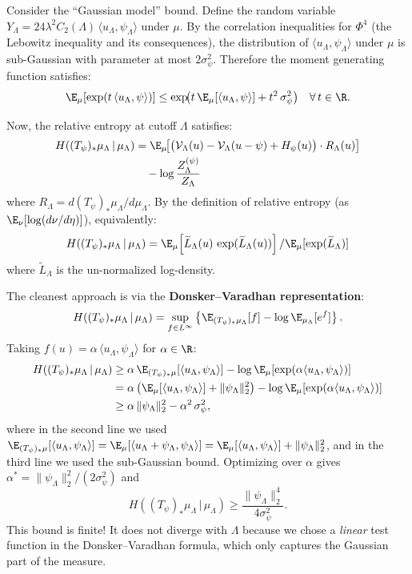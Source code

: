 Consider the ``Gaussian model'' bound. Define the random variable
$Y_\Lambda = 24\lambda^2 C_2(\Lambda)\,\langle u_\Lambda, \psi_\Lambda\rangle$
under $\mu$. By the correlation inequalities for $\Phi^4$ (the
Lebowitz inequality \cite{Leb72} and its consequences), the distribution
of $\langle u_\Lambda, \psi_\Lambda\rangle$ under $\mu$ is sub-Gaussian with
parameter at most $2\sigma_\psi^2$. Therefore the moment generating function
satisfies:
\[
  \E_\mu[\exp(t\,\langle u_\Lambda, \psi\rangle)]
  \leq \exp\!\bigl(t\,\E_\mu[\langle u_\Lambda,\psi\rangle]
  + t^2\,\sigma_\psi^2\bigr)
  \quad \forall\, t \in \R.
\]

Now, the relative entropy at cutoff $\Lambda$ satisfies:
\begin{align*}
  H((T_\psi)_*\mu_\Lambda \,|\, \mu_\Lambda)
  &= \E_\mu\!\bigl[\bigl(\mathcal{V}_\Lambda(u) - \mathcal{V}_\Lambda(u-\psi) + H_\psi(u)\bigr)
    \cdot R_\Lambda(u)\bigr] \\
  &\quad - \log\frac{Z_\Lambda^{(\psi)}}{Z_\Lambda}
\end{align*}
where $R_\Lambda = d(T_\psi)_*\mu_\Lambda / d\mu_\Lambda$. By the definition of
relative entropy (as $\E_\nu[\log(d\nu/d\eta)]$), equivalently:
\[
  H((T_\psi)_*\mu_\Lambda \,|\, \mu_\Lambda)
  = \E_\mu\!\left[\widetilde{L}_\Lambda(u)\,\exp(\widetilde{L}_\Lambda(u))\right]
    / \E_\mu[\exp(\widetilde{L}_\Lambda)]
\]
where $\widetilde{L}_\Lambda$ is the un-normalized log-density.

The cleanest approach is via the \textbf{Donsker--Varadhan representation}:
\[
  H((T_\psi)_*\mu_\Lambda \,|\, \mu_\Lambda)
  = \sup_{f \in L^\infty}\left\{
    \E_{(T_\psi)_*\mu_\Lambda}[f] - \log\E_{\mu_\Lambda}[e^f]
  \right\}.
\]
Taking $f(u) = \alpha\,\langle u_\Lambda, \psi_\Lambda\rangle$ for $\alpha \in \R$:
\begin{align}
  H((T_\psi)_*\mu_\Lambda \,|\, \mu_\Lambda)
  &\geq \alpha\,\E_{(T_\psi)_*\mu}[\langle u_\Lambda,\psi_\Lambda\rangle]
    - \log\E_\mu[\exp(\alpha\langle u_\Lambda,\psi_\Lambda\rangle)]
    \nonumber \\
  &= \alpha\,\bigl(\E_\mu[\langle u_\Lambda,\psi_\Lambda\rangle] + \|\psi_\Lambda\|_2^2\bigr)
    - \log\E_\mu[\exp(\alpha\langle u_\Lambda,\psi_\Lambda\rangle)]
    \nonumber \\
  &\geq \alpha\,\|\psi_\Lambda\|_2^2 - \alpha^2\,\sigma_\psi^2,
    \label{eq:DV-bound}
\end{align}
where in the second line we used
$\E_{(T_\psi)_*\mu}[\langle u_\Lambda,\psi_\Lambda\rangle]
= \E_\mu[\langle u_\Lambda + \psi_\Lambda, \psi_\Lambda\rangle]
= \E_\mu[\langle u_\Lambda,\psi_\Lambda\rangle] + \|\psi_\Lambda\|_2^2$,
and in the third line we used the sub-Gaussian bound. Optimizing over $\alpha$
gives $\alpha^* = \|\psi_\Lambda\|_2^2/(2\sigma_\psi^2)$ and
\[
  H((T_\psi)_*\mu_\Lambda \,|\, \mu_\Lambda)
  \geq \frac{\|\psi_\Lambda\|_2^4}{4\sigma_\psi^2}.
\]
This bound is finite! It does not diverge with $\Lambda$ because we chose a
\emph{linear} test function in the Donsker--Varadhan formula, which only
captures the Gaussian part of the measure.

